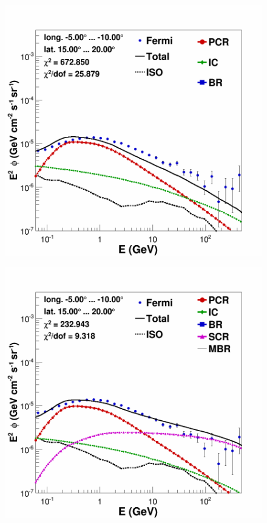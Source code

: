 \begin{figure}[h]
  \centering
  \begin{minipage}[h]{0.45\textwidth}
  	\centering
	\includegraphics[width=1.\linewidth]{pic/results/bkgdonly_spectra_bubble_example.png}
  	\label{fig:SCRonly_bubble_spec}
  \end{minipage}
  \hfill
  \begin{minipage}[h]{0.45\textwidth}
	  \centering
	  \includegraphics[width=1.\linewidth]{pic/results/SCRonly_spectra_bubble_example.png}
	  \label{fig:BKGonly_bubble_spec}
  \end{minipage}	 
  \subcaption{}
	  \label{fig:SCRonly_BKGonly_spec_comp}
\end{figure}


